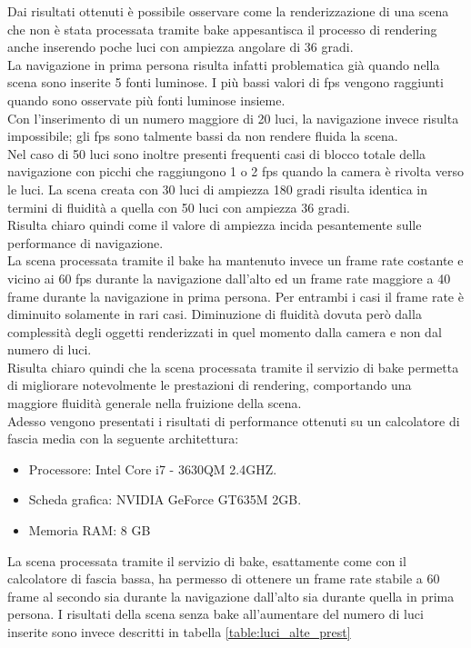 Dai risultati ottenuti è possibile osservare come la renderizzazione di una scena che non è stata processata tramite bake appesantisca il processo di rendering anche inserendo poche luci con ampiezza angolare di 36 gradi.
\\
La navigazione in prima persona risulta infatti problematica già quando nella scena sono inserite 5 fonti luminose. I più bassi valori di fps vengono raggiunti quando sono osservate più fonti luminose insieme.
\\
Con l’inserimento di un numero maggiore di 20 luci, la navigazione invece risulta impossibile; gli fps sono talmente bassi da non rendere fluida la scena.
\\
Nel caso di 50 luci sono inoltre presenti frequenti casi di blocco totale della navigazione con picchi che raggiungono 1 o 2 fps quando la camera è rivolta verso le luci.
La scena creata con 30 luci di ampiezza 180 gradi risulta identica in termini di fluidità a quella con 50 luci con ampiezza 36 gradi. 
\\
Risulta chiaro quindi come il valore di ampiezza incida pesantemente sulle performance di navigazione.
\\
La scena processata tramite il bake ha mantenuto invece un frame rate costante e vicino ai 60 fps durante la navigazione dall’alto ed un frame rate maggiore a 40 frame durante la navigazione in prima persona. Per entrambi i casi il frame rate è diminuito solamente in rari casi. Diminuzione di fluidità dovuta però dalla complessità degli oggetti renderizzati in quel momento dalla camera e non dal numero di luci.
\\
Risulta chiaro quindi che la scena processata tramite il servizio di bake permetta di migliorare notevolmente le prestazioni di rendering, comportando una maggiore fluidità generale nella fruizione della scena. 
\\
Adesso vengono presentati i risultati di performance ottenuti su un calcolatore di fascia media con la seguente architettura:
\begin{itemize}
\item Processore: Intel Core i7 - 3630QM 2.4GHZ.
\item Scheda grafica: NVIDIA GeForce GT635M 2GB.
\item Memoria RAM: 8 GB
\end{itemize}

La scena processata tramite il servizio di bake, esattamente come con il calcolatore di fascia bassa, ha permesso di ottenere un frame rate stabile a 60 frame al secondo sia durante la navigazione dall'alto sia durante quella in prima persona.
I risultati della scena senza bake all'aumentare del numero di luci inserite sono invece descritti in tabella \ref{table:luci_alte_prest}


